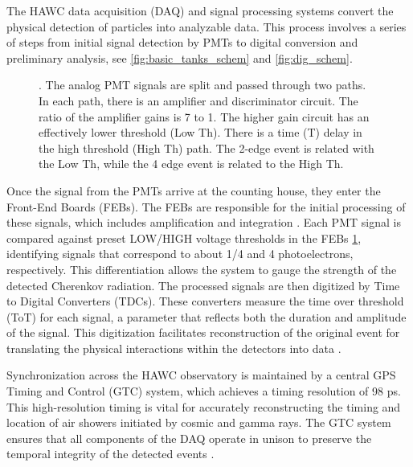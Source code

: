 The HAWC data acquisition (DAQ) and signal processing systems convert the physical detection of particles into analyzable data.
This process involves a series of steps from initial signal detection by PMTs to digital conversion and preliminary analysis, see \cref{fig:basic_tanks_schem} and \cref{fig:dig_schem}.

\begin{figure}
    \caption{. The analog PMT signals are split and passed through two paths. In each path, there is an amplifier and discriminator circuit. The ratio of the amplifier gains is 7 to 1. The higher gain circuit has an effectively lower threshold (Low Th). There is a time (T) delay in the high threshold (High Th) path. The 2-edge event is related with the Low Th, while the 4 edge event is related to the High Th.}
    \label{fig:tot_threholds}
\end{figure}

Once the signal from the PMTs arrive at the counting house, they enter the Front-End Boards (FEBs).
The FEBs are responsible for the initial processing of these signals, which includes amplification and integration \cite{Milagro_DAQ}.
Each PMT signal is compared against preset LOW/HIGH voltage thresholds in the FEBs \cref{fig:tot_threholds}, identifying signals that correspond to about 1/4 and 4 photoelectrons, respectively.
This differentiation allows the system to gauge the strength of the detected Cherenkov radiation.
The processed signals are then digitized by Time to Digital Converters (TDCs).
These converters measure the time over threshold (ToT) for each signal, a parameter that reflects both the duration and amplitude of the signal.
This digitization facilitates reconstruction of the original event for translating the physical interactions within the detectors into data \cite{nim:hawc_detect,HAWC_DAQ_NIM,Milagro_DAQ}.

Synchronization across the HAWC observatory is maintained by a central GPS Timing and Control (GTC) system, which achieves a timing resolution of 98 ps.
This high-resolution timing is vital for accurately reconstructing the timing and location of air showers initiated by cosmic and gamma rays.
The GTC system ensures that all components of the DAQ operate in unison to preserve the temporal integrity of the detected events \cite{nim:hawc_detect,hawc_daq_thesis}.

